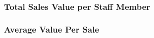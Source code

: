 \documentclass{article}
\begin{document}
            \newpage
            \subsubsection{Total Sales Value per Staff Member}



            \newpage

            \subsubsection{Average Value Per Sale}

\end{document}
